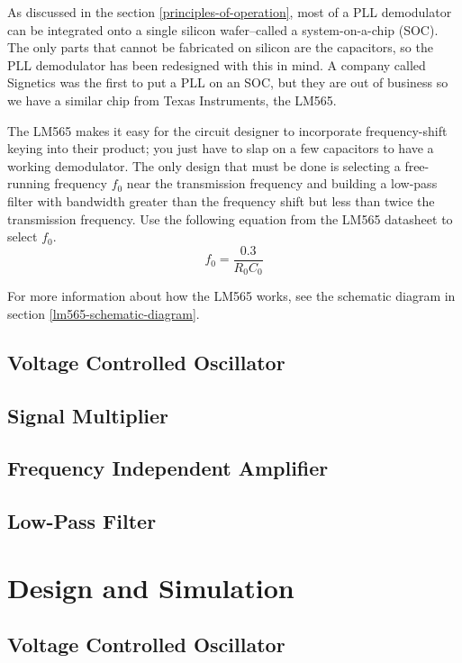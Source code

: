 \documentclass[titlepage, letterpaper, 10.5pt]{article}
\begin{document}
As discussed in the section \ref{principles-of-operation}, most of a PLL demodulator can be integrated onto a single silicon wafer--called a system-on-a-chip (SOC).
The only parts that cannot be fabricated on silicon are the capacitors, so the PLL demodulator has been redesigned with this in mind.
A company called Signetics was the first to put a PLL on an SOC, but they are out of business so we have a similar chip from Texas Instruments, the LM565.

The LM565 makes it easy for the circuit designer to incorporate frequency-shift keying into their product; you just have to slap on a few capacitors to have a working demodulator.
The only design that must be done is selecting a free-running frequency $f_{0}$ near the transmission frequency and building a low-pass filter with bandwidth greater than the frequency shift but less than twice the transmission frequency.
Use the following equation from the LM565 datasheet to select $f_{0}$.
\begin{equation}
f_{0}=\frac{0.3}{R_{0}C_{0}}
\label{f0-eq}
\end{equation}

For more information about how the LM565 works, see the schematic diagram in section \ref{lm565-schematic-diagram}.

\subsection{Voltage Controlled Oscillator}

\subsection{Signal Multiplier}

\subsection{Frequency Independent Amplifier}

\subsection{Low-Pass Filter}

\section{Design and Simulation}

\subsection{Voltage Controlled Oscillator}
\end{document}
